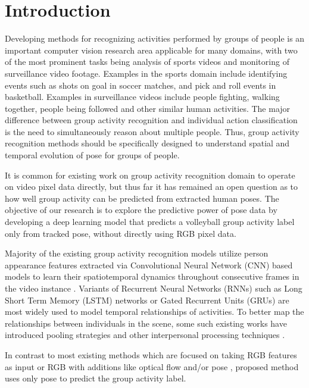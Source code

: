 \documentclass[a4paper,fleqn]{cas-dc}
\begin{document}
\section{Introduction}
Developing methods for recognizing activities performed by groups of people is an important computer vision research area applicable for many domains, with two of the most prominent tasks being analysis of sports videos and monitoring of surveillance video footage. 
Examples in the sports domain  include identifying events such as shots on goal in soccer matches, and pick and roll events in basketball. 
Examples in surveillance videos include people fighting, walking together, people being followed and other similar human activities. 
The major difference between group activity recognition and individual action classification is the need to simultaneously reason about multiple people. 
Thus, group activity recognition methods should be specifically designed to understand spatial and temporal evolution of pose for groups of people. 

It is common for existing work on group activity recognition domain to operate on video pixel data directly, 
but thus far it has remained an open question as to how well group activity can be predicted from extracted human poses. 
The objective of our research is to explore the predictive power of pose data by developing a deep learning model that predicts a volleyball group activity label only from tracked pose, without directly using RGB pixel data.

Majority of the existing group activity recognition models utilize person appearance features extracted via Convolutional Neural Network (CNN) based models to learn their spatiotemporal dynamics throughout consecutive frames in the video instance \cite{Ibrahim2016_hierarchical_deep,Ramanathan2016_keyperson,Lu2019_spatioTempAtt}. 
Variants of Recurrent Neural Networks (RNNs) such as Long Short Term Memory (LSTM) networks or Gated Recurrent Units (GRUs) are most widely used to model temporal relationships of activities. 
To better map the relationships between individuals in the scene, some such existing works have introduced pooling strategies and other interpersonal processing techniques \cite{Bagautdinov2017_socialScene,Azar2018_multistream}. 

In contrast to most existing methods which are focused on taking RGB features as input \cite{Ibrahim2016_hierarchical_deep,Ramanathan2016_keyperson} or RGB with additions like optical flow \cite{Azar2018_multistream,Azar2019_convoRelational} and/or pose \cite{Lu2019_spatioTempAtt,Gavrilyuk2020_ActorTransformer}, proposed method uses only pose to predict the group activity label.
\end{document}
